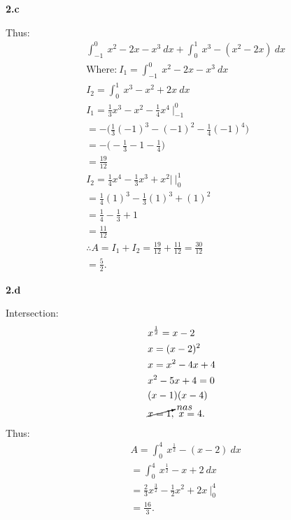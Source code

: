 \documentclass{report}
\begin{document}
    \pagebreak \bigbreak \noindent 
    \textbf{2.c}
    \bigbreak \noindent 
    \begin{minipage}[]{0.47\textwidth}
    \end{minipage}
    \begin{minipage}[]{0.47\textwidth}
    Thus:
    \begin{align*}
        &\int_{-1}^{0}\ x^{2}-2x - x^{3}\ dx + \int_{0}^{1}\ x^{3}-(x^{2}-2x)\ dx \\
        &\text{Where:}\ I_{1} = \int_{-1}^{0}\ x^{2} - 2x -x^{3}\ dx  \\
        &I_{2} = \int_{0}^{1}\ x^{3}-x^{2}+2x\ dx\\
        &I_{1} =  \frac{1}{3}x^{3}-x^{2}-\frac{1}{4}x^{4}\ \bigg|_{-1}^{0} \\
        &= -\bigg(\frac{1}{3}(-1)^{3}-(-1)^{2}-\frac{1}{4}(-1)^{4}\bigg) \\
        &= -\bigg(-\frac{1}{3}-1-\frac{1}{4}\bigg) \\
        &=\frac{19}{12} \\
        &I_{2} = \frac{1}{4}x^{4}-\frac{1}{3}x^{3}+x^{2}|\ \bigg|_{0}^{1} \\
        &= \frac{1}{4}(1)^{3}-\frac{1}{3}(1)^{3}+(1)^{2} \\
        &= \frac{1}{4}-\frac{1}{3}+1 \\
        &=\frac{11}{12} \\
        &\therefore A = I_{1} + I_{2} = \frac{19}{12} + \frac{11}{12} = \frac{30}{12}  \\
        &= \frac{5}{2} 
    .\end{align*}
    \end{minipage}

    \bigbreak \noindent 
    \textbf{2.d}
    \bigbreak \noindent 
    \begin{minipage}[]{0.47\textwidth}
    \end{minipage}
    \begin{minipage}[]{0.47\textwidth}
        Intersection:
        \begin{align*}
            &x^{\frac{1}{2}} = x-2 \\
            &x = (x-2)^{2} \\
            &x = x^{2}-4x+4 \\
            &x^{2}-5x+4 = 0 \\
            &(x-1)(x-4) \\
            &\cancelto{nas}{x=1},\ x=4
        .\end{align*}
        \bigbreak \noindent 
        Thus:
        \begin{align*}
            &A = \int_{0}^{4}\ x^{\frac{1}{2}}-(x-2)\ dx \\
            &=\int_{0}^{4}\ x^{\frac{1}{2}}-x+2\ dx \\
            &= \frac{2}{3}x^{\frac{3}{2}}-\frac{1}{2}x^{2}+2x\ \bigg|_0^{4} \\
            &=\frac{16}{3}
        .\end{align*}
    \end{minipage}
\end{document}
